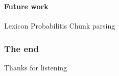 \documentclass[10pt]{beamer}
\renewcommand{\baselinestretch}{1.5}
\begin{document}
\begin{frame}
 \renewcommand{\baselinestretch}{1.0}
\frametitle{}
\framesubtitle{Future work} 
Lexicon
Probabilitis
Chunk parsing
\end{frame}

\begin{frame}
    \frametitle{The end}
\large\begin{center}Thanks for listening\end{center}
\end{frame}
\end{document}
